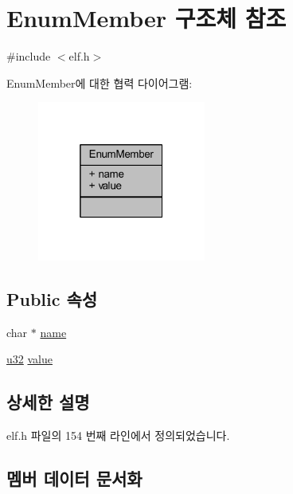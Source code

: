 \hypertarget{struct_enum_member}{}\section{Enum\+Member 구조체 참조}
\label{struct_enum_member}


{\ttfamily \#include $<$elf.\+h$>$}



Enum\+Member에 대한 협력 다이어그램\+:\nopagebreak
\begin{figure}[H]
\begin{center}
\leavevmode
\includegraphics[width=157pt]{struct_enum_member__coll__graph}
\end{center}
\end{figure}
\subsection*{Public 속성}
\begin{DoxyCompactItemize}
\item 
char $\ast$ \mbox{\hyperlink{struct_enum_member_aee93a0df0cd2b1a1fe587878fbd10379}{name}}
\item 
\mbox{\hyperlink{_system_8h_a10e94b422ef0c20dcdec20d31a1f5049}{u32}} \mbox{\hyperlink{struct_enum_member_a087360a6d98032f07a743435e3c19b43}{value}}
\end{DoxyCompactItemize}


\subsection{상세한 설명}


elf.\+h 파일의 154 번째 라인에서 정의되었습니다.



\subsection{멤버 데이터 문서화}
\mbox{\label{struct_enum_member_aee93a0df0cd2b1a1fe587878fbd10379}} 
